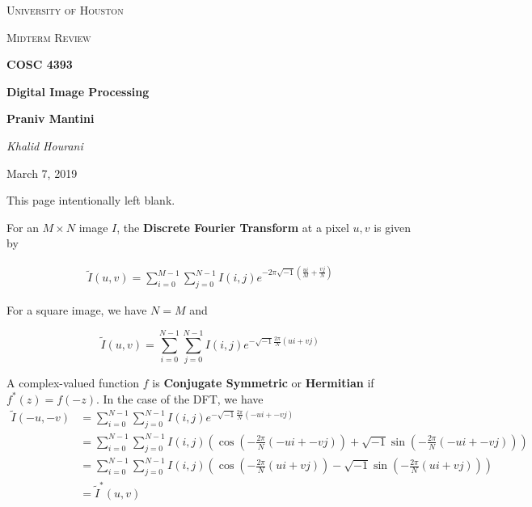 \documentclass[a4paper]{article}
\begin{document}
\begin{titlepage}
	\centering
	{\scshape\LARGE University of Houston\par}
	\vspace{1cm}
	{\scshape\Large Midterm Review \par}
	\vspace{1.5cm}
	{\huge\bfseries COSC  4393\par}
	{\huge\bfseries Digital Image Processing\par}
	\vspace{0.5cm}
	{\large\bfseries Praniv Mantini\par}
	\vspace{2cm}
	{\Large\itshape Khalid Hourani\par}
	\vspace{0.5cm}
	{\large \par} March 7, 2019
	\vfill

\end{titlepage}
\vspace*{\fill}\begin{center}{\Huge This page intentionally left blank.}\end{center}\vspace*{\fill}\thispagestyle{empty}\clearpage
{}

For an $M\times N$ image $I$, the \textbf{Discrete Fourier Transform} at a pixel $u, v$ is given by 

\begin{align*}
 \tilde{I}(u, v)=\sum_{i=0}^{M-1}\sum_{j=0}^{N-1}I(i, j)e^{-2\pi\sqrt{-1}\left(\frac{ui}{M}+\frac{vj}{N}\right)}
\end{align*}

For a square image, we have $N=M$ and 

\[ \tilde{I}(u, v)=\sum_{i=0}^{N-1}\sum_{j=0}^{N-1}I(i, j)e^{-\sqrt{-1}\frac{2\pi}{N}\left(ui+vj\right)}\]

A complex-valued function $f$ is \textbf{Conjugate Symmetric} or \textbf{Hermitian} if $f^*(z)=f(-z)$. In the case of the DFT, we have 
\begin{align*}
 \tilde{I}(-u, -v)&=\sum_{i=0}^{N-1}\sum_{j=0}^{N-1}I(i, j)e^{-\sqrt{-1}\frac{2\pi}{N}\left(-ui+-vj\right)}
		\\&=\sum_{i=0}^{N-1}\sum_{j=0}^{N-1}I(i, j)\left(\cos{\left(-\frac{2\pi}{N}\left(-ui+-vj\right)\right)}+\sqrt{-1}\sin{\left(-\frac{2\pi}{N}\left(-ui+-vj\right)\right)}\right)
		\\&=\sum_{i=0}^{N-1}\sum_{j=0}^{N-1}I(i, j)\left(\cos{\left(-\frac{2\pi}{N}\left(ui+vj\right)\right)}-\sqrt{-1}\sin{\left(-\frac{2\pi}{N}\left(ui+vj\right)\right)}\right)
		\\&=\tilde{I}^*(u, v)
\end{align*}
\end{document}
